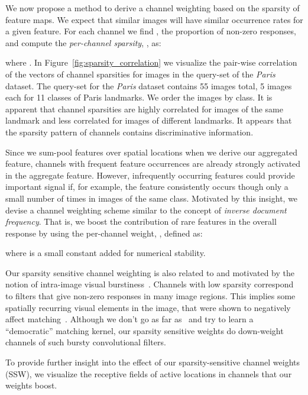 \documentclass[runningheads]{llncs}
\begin{document}
We now propose a method to derive a channel weighting based on the sparsity of feature maps. We expect that similar images will have similar occurrence rates for a given feature. For each channel  we find , the proportion of non-zero responses, and compute the \emph{per-channel sparsity}, , as:

where  .
In Figure~\ref{fig:sparsity_correlation} we visualize the pair-wise correlation of the vectors of channel sparsities  for images in the query-set of the \emph{Paris} dataset. The query-set for the \emph{Paris} dataset contains 55 images total, 5 images each for 11 classes of Paris landmarks. We order the images by class. It is apparent that channel sparsities  are highly correlated for images of the same landmark and less correlated for images of different landmarks. It appears that the sparsity pattern of channels contains discriminative information.



Since we sum-pool features  over spatial locations when we derive our aggregated feature, channels with frequent feature occurrences are already strongly activated in the aggregate feature. However, infrequently occurring features could provide important signal if, for example, the feature consistently occurs though only a small number of times in images of the same class. Motivated by this insight, we devise a channel weighting scheme similar to the concept of \emph{inverse document frequency}. That is, we boost the contribution of rare features in the overall response by using the per-channel weight, , defined as:



where  is a small constant added for numerical stability.



Our sparsity sensitive channel weighting is also related to and motivated by the notion of intra-image visual burstiness~\cite{JeDS09}. Channels with low sparsity correspond to filters that give non-zero responses in many image regions. This implies some spatially recurring visual elements in the image, that were shown to negatively affect matching~\cite{JeDS09}. Although we don't go as far as~\cite{JeZi14} and try to learn a ``democratic'' matching kernel, our sparsity sensitive weights do down-weight channels of such bursty convolutional filters.

To provide further insight into the effect of our sparsity-sensitive channel weights (SSW), we visualize the receptive fields of active locations in channels that our weights boost.
\end{document}
